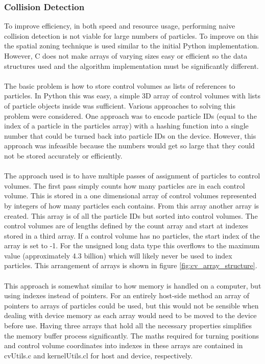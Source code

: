 \documentclass[10pt,a4paper,titlepage]{report}
\begin{document}
\subsubsection{Collision Detection}
\label{sec:OpenCL Collision Detection}
To improve efficiency, in both speed and resource usage, performing naive collision detection is not viable for large numbers of particles. To improve on this the spatial zoning technique is used similar to the initial Python implementation. However, C does not make arrays of varying sizes easy or efficient so the data structures used and the algorithm implementation must be significantly different.
\\\\The basic problem is how to store control volumes as lists of references to particles. In Python this was easy, a simple 3D array of control volumes with lists of particle objects inside was sufficient. Various approaches to solving this problem were considered. One approach was to encode particle IDs (equal to the index of a particle in the particles array) with a hashing function into a single number that could be turned back into particle IDs on the device. However, this approach was infeasible because the numbers would get so large that they could not be stored accurately or efficiently.
\\\\The approach used is to have multiple passes of assignment of particles to control volumes. The first pass simply counts how many particles are in each control volume. This is stored in a one dimensional array of control volumes represented by integers of how many particles each contains. From this array another array is created. This array is of all the particle IDs but sorted into control volumes. The control volumes are of lengths defined by the count array and start at indexes stored in a third array. If a control volume has no particles, the start index of the array is set to -1. For the unsigned long data type this overflows to the maximum value (approximately 4.3 billion) which will likely never be used to index particles. This arrangement of arrays is shown in figure \ref{fig:cv_array_structure}.
\\\\This approach is somewhat similar to how memory is handled on a computer, but using indexes instead of pointers. For an entirely host-side method an array of pointers to arrays of particles could be used, but this would not be sensible when dealing with device memory as each array would need to be moved to the device before use. Having three arrays that hold all the necessary properties simplifies the memory buffer process significantly. The maths required for turning positions and control volume coordinates into indexes in these arrays are contained in cvUtils.c and kernelUtils.cl for host and device, respectively.
\end{document}
